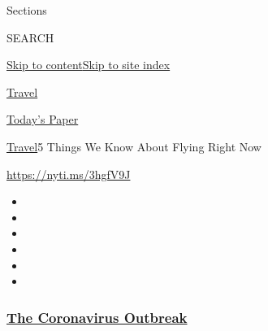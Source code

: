 Sections

SEARCH

\protect\hyperlink{site-content}{Skip to
content}\protect\hyperlink{site-index}{Skip to site index}

\href{https://www.nytimes3xbfgragh.onion/section/travel}{Travel}

\href{https://myaccount.nytimes3xbfgragh.onion/auth/login?response_type=cookie\&client_id=vi}{}

\href{https://www.nytimes3xbfgragh.onion/section/todayspaper}{Today's
Paper}

\href{/section/travel}{Travel}\textbar{}5 Things We Know About Flying
Right Now

\url{https://nyti.ms/3hgfV9J}

\begin{itemize}
\item
\item
\item
\item
\item
\item
\end{itemize}

\hypertarget{the-coronavirus-outbreak}{%
\subsubsection{\texorpdfstring{\href{https://www.nytimes3xbfgragh.onion/news-event/coronavirus?name=styln-coronavirus-national\&region=TOP_BANNER\&block=storyline_menu_recirc\&action=click\&pgtype=Article\&impression_id=0fae8cc0-f1df-11ea-98d7-2bcdd79e137a\&variant=undefined}{The
Coronavirus
Outbreak}}{The Coronavirus Outbreak}}\label{the-coronavirus-outbreak}}

